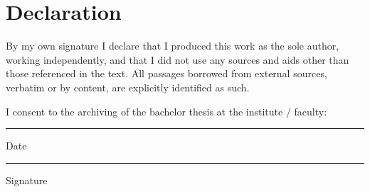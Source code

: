 \section*{Declaration}

By  my  own  signature  I  declare  that  I  produced  this  work  as  the  sole author, working independently, and that I did not use any sources and aids other than those referenced in the text. All passages borrowed from external sources, verbatim or by content, are explicitly identified as such.

I consent to the archiving of the bachelor thesis at the institute / faculty:

\vspace{1.8cm}

\parbox{6cm}{
	\hrule
	\strut \centering\footnotesize Date
} \hfill
\parbox{6cm}{
	\hrule
	\strut \centering\footnotesize Signature
}